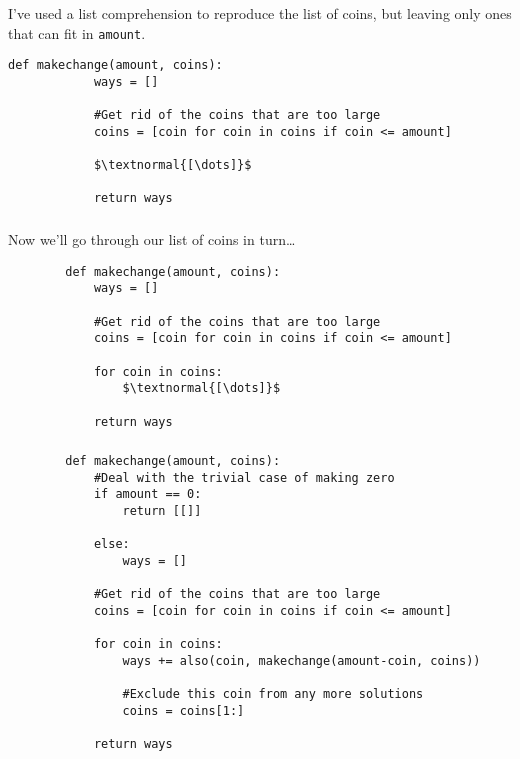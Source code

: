 \documentclass[handout]{beamer}
\begin{document}
	\begin{frame}[fragile]
		\frametitle{}
		
		I've used a list comprehension to reproduce the list of coins, but leaving only ones that can fit in \lstinline|amount|.
		
		\begin{lstlisting}[basicstyle=\tt\footnotesize]
		def makechange(amount, coins):
		    ways = []
		
		    #Get rid of the coins that are too large
		    coins = [coin for coin in coins if coin <= amount]
		
		    $\textnormal{[\dots]}$
		
		    return ways
		\end{lstlisting}
	\end{frame}
	
	\begin{frame}[fragile]
		\frametitle{}
		
		Now we'll go through our list of coins in turn\dots
		
		\begin{lstlisting}
		def makechange(amount, coins):
		    ways = []
		
		    #Get rid of the coins that are too large
		    coins = [coin for coin in coins if coin <= amount]
		
		    for coin in coins:
		        $\textnormal{[\dots]}$
		
		    return ways
		\end{lstlisting}
	\end{frame}
	
	\begin{frame}[fragile]
		\frametitle{}
		
		\begin{lstlisting}
		def makechange(amount, coins):
		    #Deal with the trivial case of making zero
		    if amount == 0:
		        return [[]]
		
		    else:
		        ways = []
		
		    #Get rid of the coins that are too large
		    coins = [coin for coin in coins if coin <= amount]
		
		    for coin in coins:
		        ways += also(coin, makechange(amount-coin, coins))
		
		        #Exclude this coin from any more solutions
		        coins = coins[1:]
		
		    return ways
		\end{lstlisting}
	\end{frame}
	
\end{document}
